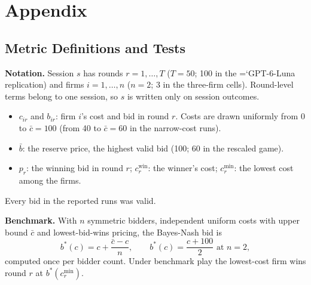 \documentclass[10pt]{article}
\newcommand{\model}[1]{{\ttfamily\hyphenchar\font=`\-\relax #1}}
\newcommand{\LU}{\model{GPT-6-Luna}}
\newcommand{\para}[1]{\textbf{#1}\hspace{0.4em}}
\begin{document}
\section*{Appendix}
\setcounter{subsection}{0}
\renewcommand{\thesubsection}{\Alph{subsection}}
\titleformat{\subsection}{\fontsize{13}{16}\selectfont\bfseries\color{headthree}}{\thesubsection.}{0.5em}{}
\subsection{Metric Definitions and Tests}
\label{app:metrics}

\para{Notation.} Session $s$ has rounds $r = 1, \dots, T$ ($T = 50$; 100 in the \LU{} replication) and firms $i = 1, \dots, n$ ($n = 2$; 3 in the three-firm cells). Round-level terms belong to one session, so $s$ is written only on session outcomes.
\begin{itemize}[leftmargin=1.5em,itemsep=0pt,topsep=2pt]
\item $c_{ir}$ and $b_{ir}$: firm $i$'s cost and bid in round $r$. Costs are drawn uniformly from 0 to $\bar c = 100$ (from 40 to $\bar c = 60$ in the narrow-cost runs).
\item $\bar b$: the reserve price, the highest valid bid (100; 60 in the rescaled game).
\item $p_r$: the winning bid in round $r$; $c^{\text{win}}_r$: the winner's cost; $c^{\min}_r$: the lowest cost among the firms.
\end{itemize}
Every bid in the reported runs was valid.

\para{Benchmark.} With $n$ symmetric bidders, independent uniform costs with upper bound $\bar c$ and lowest-bid-wins pricing, the Bayes-Nash bid is
\[
b^*(c) = c + \frac{\bar c - c}{n}, \qquad b^*(c) = \frac{c + 100}{2} \text{ at } n = 2,
\]
computed once per bidder count. Under benchmark play the lowest-cost firm wins round $r$ at $b^*(c^{\min}_r)$.
\end{document}
